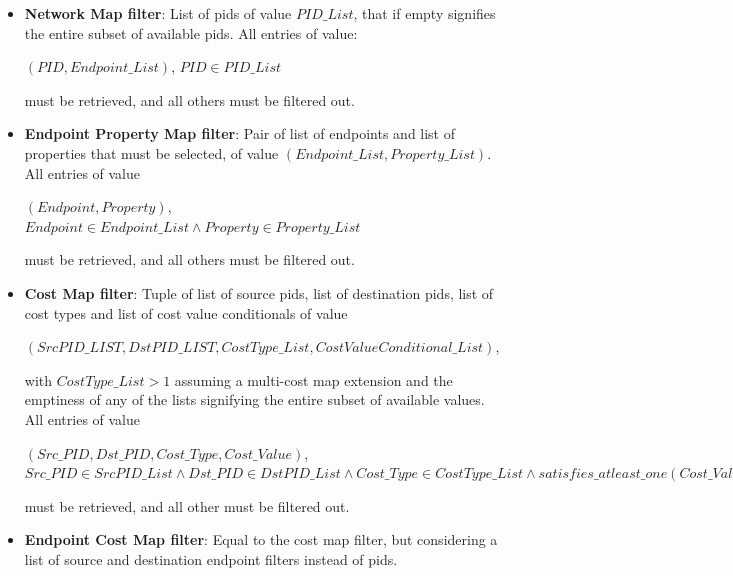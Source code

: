     \begin{itemize}
        \item \textbf{Network Map filter}: List of \gls{pids} of value $PID\_List$, that if empty signifies the entire subset of available \gls{pids}.
            All entries of value:

            \begin{center}
            $(PID, Endpoint\_List)$, $PID \in PID\_List$
            \end{center}

            must be retrieved, and all others must be filtered out.

        \item \textbf{Endpoint Property Map filter}: Pair of list of endpoints and list of properties that must be selected, of value $(Endpoint\_List, Property\_List)$.
            All entries of value

            \begin{center}
            $(Endpoint, Property)$, $Endpoint \in Endpoint\_List \land Property \in Property\_List$
            \end{center}

            must be retrieved, and all others must be filtered out.

        \item \textbf{Cost Map filter}: Tuple of list of source \gls{pids}, list of destination \gls{pids}, list of cost types and list of cost value conditionals of value

            $(SrcPID\_LIST, DstPID\_LIST, CostType\_List, CostValueConditional\_List)$,

            with $CostType\_List > 1$ assuming a multi-cost map extension and the emptiness of any of the lists signifying the entire subset of available values.
            All entries of value

            \begin{center}
            $(Src\_PID, Dst\_PID, Cost\_Type, Cost\_Value)$, $Src\_PID \in SrcPID\_List \land Dst\_PID \in DstPID\_List \land Cost\_Type \in CostType\_List \land satisfies\_atleast\_one(Cost\_Value, CostValueConditional\_List)$
            \end{center}

             must be retrieved, and all other must be filtered out.

         \item \textbf{Endpoint Cost Map filter}: Equal to the cost map filter, but considering a list of source and destination endpoint filters instead of \gls{pids}.
    \end{itemize}

